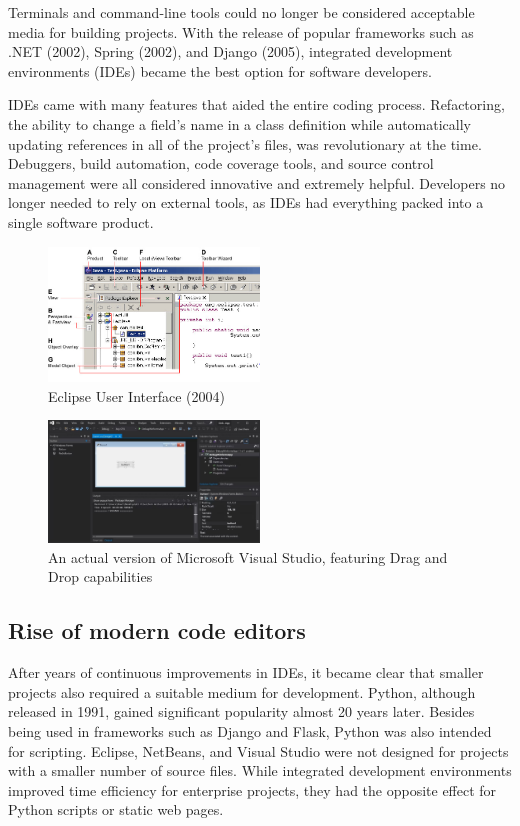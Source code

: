 Terminals and command-line tools could no longer be considered acceptable media for building projects. With the release of popular frameworks such as .NET (2002), Spring (2002), and Django (2005), integrated development environments (IDEs) became the best option for software developers.

IDEs came with many features that aided the entire coding process. Refactoring, the ability to change a field's name in a class definition while automatically updating references in all of the project's files, was revolutionary at the time. Debuggers, build automation, code coverage tools, and source control management were all considered innovative and extremely helpful. Developers no longer needed to rely on external tools, as IDEs had everything packed into a single software product.

\begin{figure}[h]
\centering
\includegraphics[width=0.5\textwidth]{images/eclipse.jpg}
\caption{Eclipse User Interface (2004)}
\label{fig:fig2,1.}
\end{figure}

\begin{figure}[h]
\centering
\includegraphics[width=0.5\textwidth]{images/visual_studio.jpg}
\caption{An actual version of Microsoft Visual Studio, featuring Drag and Drop capabilities}
\label{fig:fig2,1.}
\end{figure}

\subsection{Rise of modern code editors}

After years of continuous improvements in IDEs, it became clear that smaller projects also required a suitable medium for development. Python, although released in 1991, gained significant popularity almost 20 years later. Besides being used in frameworks such as Django and Flask, Python was also intended for scripting. Eclipse, NetBeans, and Visual Studio were not designed for projects with a smaller number of source files. While integrated development environments improved time efficiency for enterprise projects, they had the opposite effect for Python scripts or static web pages.

